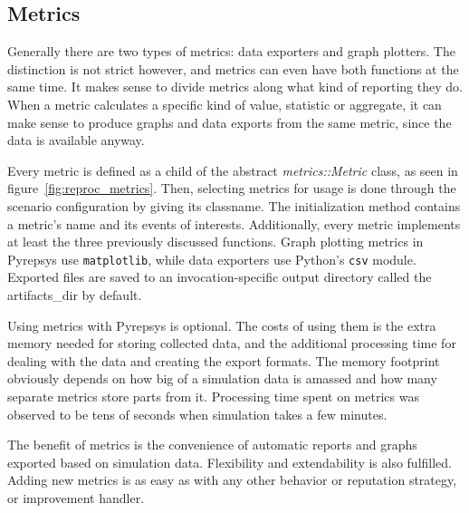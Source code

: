 \documentclass[%
    ]{\PathToTumTemplate/thesis/tum_thesis}
\begin{document}
\subsection{Metrics}

Generally there are two types of metrics: data exporters and graph plotters.
The distinction is not strict however, and metrics can even have both functions at the same time.
It makes sense to divide metrics along what kind of reporting they do.
When a metric calculates a specific kind of value, statistic or aggregate, it can make sense to produce graphs and data exports from the same metric, since the data is available anyway.

Every metric is defined as a child of the abstract \emph{metrics::Metric} class, as seen in figure~\ref{fig:reproc_metrics}.
Then, selecting metrics for usage is done through the scenario configuration by giving its classname.
The initialization method contains a metric's name and its events of interests.
Additionally, every metric implements at least the three previously discussed functions.
Graph plotting metrics in Pyrepsys use \texttt{matplotlib}, while data exporters use Python's \texttt{csv} module.
Exported files are saved to an invocation-specific output directory called the \gls{artifacts_dir} by default.

Using metrics with Pyrepsys is optional.
The costs of using them is the extra memory needed for storing collected data, and the additional processing time for dealing with the data and creating the export formats.
The memory footprint obviously depends on how big of a simulation data is amassed and how many separate metrics store parts from it.
Processing time spent on metrics was observed to be tens of seconds when simulation takes a few minutes.

The benefit of metrics is the convenience of automatic reports and graphs exported based on simulation data.
Flexibility and extendability is also fulfilled.
Adding new metrics is as easy as with any other behavior or reputation strategy, or improvement handler.
\end{document}
